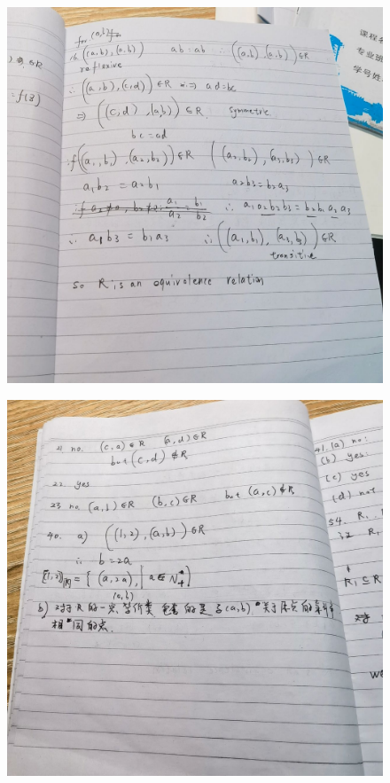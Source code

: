 \documentclass{article}
\begin{document}
    \begin{figure}[H]
    \centering
    \includegraphics[width=1\textwidth]{hw10/IMG_20221205_183725.jpg}
    \caption{\label{Lab9}}
    \end{figure}

    \begin{figure}[H]
    \centering
    \includegraphics[width=1\textwidth]{hw10/IMG_20221205_183730.jpg}
    \caption{\label{Lab9}}
    \end{figure}
\end{document}
